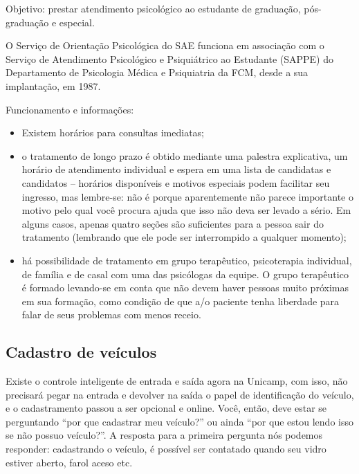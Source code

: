 Objetivo: prestar atendimento psicológico ao estudante de graduação,
pós-graduação e especial.

O Serviço de Orientação Psicológica do SAE funciona em associação com o Serviço
de Atendimento Psicológico e Psiquiátrico ao Estudante (SAPPE) do Departamento
de Psicologia Médica e Psiquiatria da FCM, desde a sua implantação, em 1987.

Funcionamento e informações:

\begin{itemize}
    \item  Existem horários para consultas imediatas; %

    \item  o tratamento de longo prazo é obtido mediante uma palestra
        explicativa, um horário de atendimento individual e espera em uma lista
        de candidatas e candidatos -- horários disponíveis e motivos especiais
        podem facilitar seu ingresso, mas lembre-se: não é porque aparentemente
        não parece importante o motivo pelo qual você procura ajuda que isso
        não deva ser levado a sério. Em alguns casos, apenas quatro seções são
        suficientes para a pessoa sair do tratamento (lembrando que ele pode
        ser interrompido a qualquer momento);

    \item  há possibilidade de tratamento em grupo terapêutico, psicoterapia
        individual, de família e de casal com uma das psicólogas da equipe. O
        grupo terapêutico é formado levando-se em conta que não devem haver
        pessoas muito próximas em sua formação, como condição de que a/o
        paciente tenha liberdade para falar de seus problemas com menos receio.
\end{itemize}

\subsection{Cadastro de veículos}

Existe o controle inteligente de entrada e saída agora na Unicamp, com isso,
não precisará pegar na entrada e devolver na saída o papel de identificação do
veículo, e o cadastramento passou a ser opcional e online. Você, então, deve
estar se perguntando ``por que cadastrar meu veículo?'' ou ainda ``por que
estou lendo isso se não possuo veículo?''. A resposta para a primeira pergunta
nós podemos responder: cadastrando o veículo, é possível ser contatado quando
seu vidro estiver aberto, farol aceso etc.

